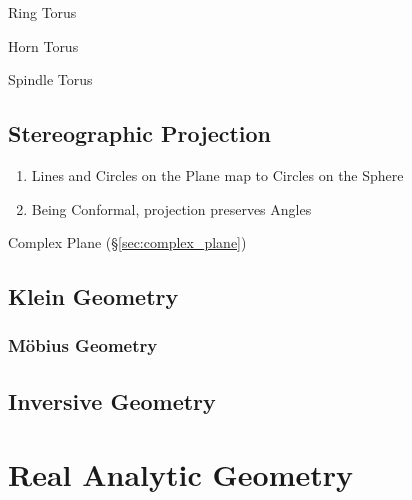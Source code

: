 Ring Torus

Horn Torus

Spindle Torus



\subsection{Stereographic Projection}\label{sec:stereographic_projection}

\begin{enumerate}
  \item Lines and Circles on the Plane map to Circles on the Sphere
  \item Being Conformal, projection preserves Angles
\end{enumerate}

Complex Plane (\S\ref{sec:complex_plane})



\subsection{Klein Geometry}\label{sec:klein_geometry}




\subsubsection{M\"obius Geometry}\label{sec:mobius_geometry}



\subsection{Inversive Geometry}\label{sec:inversive_geometry}



\section{Real Analytic Geometry}\label{sec:real_analytic_geometry}
